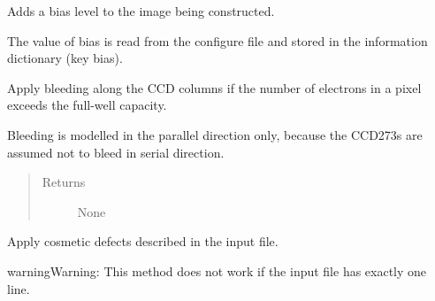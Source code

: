 \documentclass[a4paper,12pt,english]{sphinxmanual}
\begin{document}
\begin{fulllineitems}
\begin{fulllineitems}
\end{fulllineitems}


\begin{fulllineitems}
\label{simulator:simulator.simulator.VISsimulator.applyBias}
Adds a bias level to the image being constructed.

The value of bias is read from the configure file and stored
in the information dictionary (key bias).

\end{fulllineitems}


\begin{fulllineitems}
\label{simulator:simulator.simulator.VISsimulator.applyBleeding}
Apply bleeding along the CCD columns if the number of electrons in a pixel exceeds the full-well capacity.

Bleeding is modelled in the parallel direction only, because the CCD273s are assumed not to bleed in
serial direction.
\begin{quote}\begin{description}
\item[{Returns}] \leavevmode
None

\end{description}\end{quote}

\end{fulllineitems}


\begin{fulllineitems}
\label{simulator:simulator.simulator.VISsimulator.applyCosmetics}
Apply cosmetic defects described in the input file.

\begin{notice}{warning}{Warning:}
This method does not work if the input file has exactly one line.
\end{notice}

\end{fulllineitems}



\end{fulllineitems}
\end{document}
